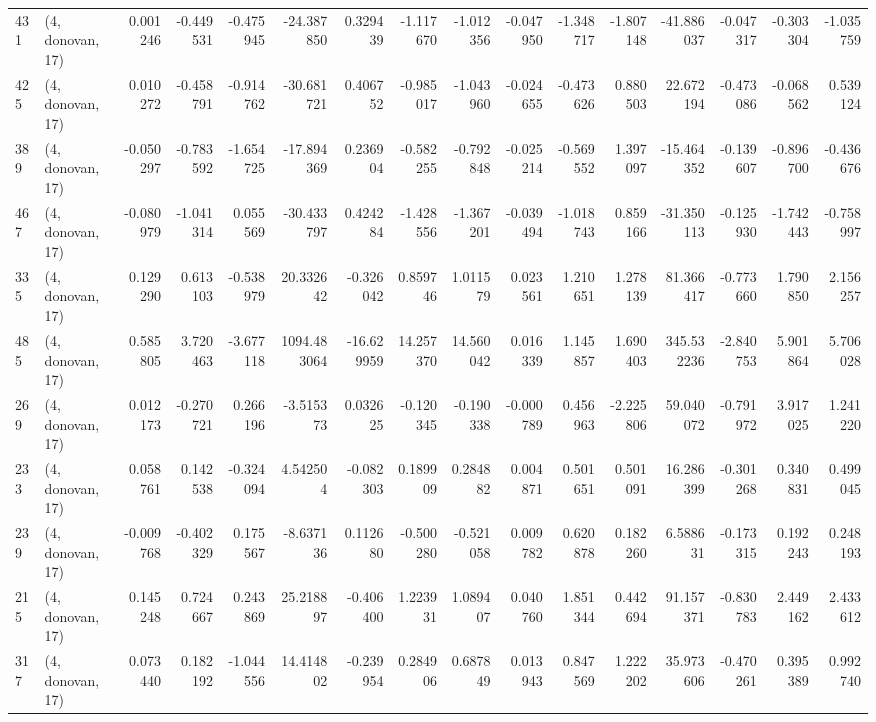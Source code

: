 \begin{tabular}{llrrrrrrrrrrrrrr}
431 &  (4, donovan, 17) &   0.001246 & -0.449531 & -0.475945 &   -24.387850 &   0.329439 &  -1.117670 &  -1.012356 & -0.047950 & -1.348717 & -1.807148 &  -41.886037 & -0.047317 & -0.303304 & -1.035759 \\
425 &  (4, donovan, 17) &   0.010272 & -0.458791 & -0.914762 &   -30.681721 &   0.406752 &  -0.985017 &  -1.043960 & -0.024655 & -0.473626 &  0.880503 &   22.672194 & -0.473086 & -0.068562 &  0.539124 \\
389 &  (4, donovan, 17) &  -0.050297 & -0.783592 & -1.654725 &   -17.894369 &   0.236904 &  -0.582255 &  -0.792848 & -0.025214 & -0.569552 &  1.397097 &  -15.464352 & -0.139607 & -0.896700 & -0.436676 \\
467 &  (4, donovan, 17) &  -0.080979 & -1.041314 &  0.055569 &   -30.433797 &   0.424284 &  -1.428556 &  -1.367201 & -0.039494 & -1.018743 &  0.859166 &  -31.350113 & -0.125930 & -1.742443 & -0.758997 \\
335 &  (4, donovan, 17) &   0.129290 &  0.613103 & -0.538979 &    20.332642 &  -0.326042 &   0.859746 &   1.011579 &  0.023561 &  1.210651 &  1.278139 &   81.366417 & -0.773660 &  1.790850 &  2.156257 \\
485 &  (4, donovan, 17) &   0.585805 &  3.720463 & -3.677118 &  1094.483064 & -16.629959 &  14.257370 &  14.560042 &  0.016339 &  1.145857 &  1.690403 &  345.532236 & -2.840753 &  5.901864 &  5.706028 \\
269 &  (4, donovan, 17) &   0.012173 & -0.270721 &  0.266196 &    -3.515373 &   0.032625 &  -0.120345 &  -0.190338 & -0.000789 &  0.456963 & -2.225806 &   59.040072 & -0.791972 &  3.917025 &  1.241220 \\
233 &  (4, donovan, 17) &   0.058761 &  0.142538 & -0.324094 &     4.542504 &  -0.082303 &   0.189909 &   0.284882 &  0.004871 &  0.501651 &  0.501091 &   16.286399 & -0.301268 &  0.340831 &  0.499045 \\
239 &  (4, donovan, 17) &  -0.009768 & -0.402329 &  0.175567 &    -8.637136 &   0.112680 &  -0.500280 &  -0.521058 &  0.009782 &  0.620878 &  0.182260 &    6.588631 & -0.173315 &  0.192243 &  0.248193 \\
215 &  (4, donovan, 17) &   0.145248 &  0.724667 &  0.243869 &    25.218897 &  -0.406400 &   1.223931 &   1.089407 &  0.040760 &  1.851344 &  0.442694 &   91.157371 & -0.830783 &  2.449162 &  2.433612 \\
317 &  (4, donovan, 17) &   0.073440 &  0.182192 & -1.044556 &    14.414802 &  -0.239954 &   0.284906 &   0.687849 &  0.013943 &  0.847569 &  1.222202 &   35.973606 & -0.470261 &  0.395389 &  0.992740 \\

\end{tabular}
